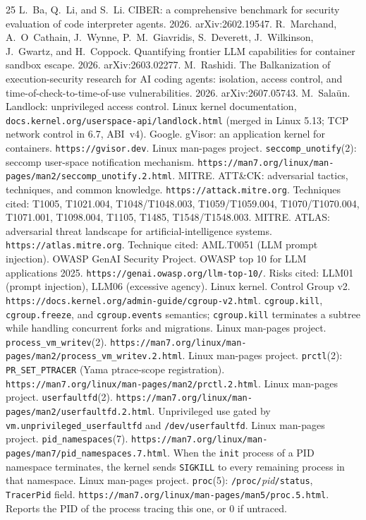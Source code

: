 \documentclass[11pt]{article}
\begin{document}
\begin{thebibliography}{25}
 L.~Ba, Q.~Li, and S.~Li. CIBER: a comprehensive benchmark for security evaluation of code interpreter agents. 2026. arXiv:2602.19547.
 R.~Marchand, A.~O~Cathain, J.~Wynne, P.~M.~Giavridis, S.~Deverett, J.~Wilkinson, J.~Gwartz, and H.~Coppock. Quantifying frontier LLM capabilities for container sandbox escape. 2026. arXiv:2603.02277.
 M.~Rashidi. The Balkanization of execution-security research for AI coding agents: isolation, access control, and time-of-check-to-time-of-use vulnerabilities. 2026. arXiv:2607.05743.
 M.~Salaün. Landlock: unprivileged access control. Linux kernel documentation, \texttt{docs.kernel.org/userspace-api/landlock.html} (merged in Linux 5.13; TCP network control in 6.7, ABI~v4).
 Google. gVisor: an application kernel for containers. \texttt{https://gvisor.dev}.
 Linux man-pages project. \texttt{seccomp\_unotify}(2): seccomp user-space notification mechanism. \texttt{https://man7.org/linux/man-pages/man2/seccomp\_unotify.2.html}.
 MITRE. ATT\&CK: adversarial tactics, techniques, and common knowledge. \texttt{https://attack.mitre.org}. Techniques cited: T1005, T1021.004, T1048/T1048.003, T1059/T1059.004, T1070/T1070.004, T1071.001, T1098.004, T1105, T1485, T1548/T1548.003.
 MITRE. ATLAS: adversarial threat landscape for artificial-intelligence systems. \texttt{https://atlas.mitre.org}. Technique cited: AML.T0051 (LLM prompt injection).
 OWASP GenAI Security Project. OWASP top 10 for LLM applications 2025. \texttt{https://genai.owasp.org/llm-top-10/}. Risks cited: LLM01 (prompt injection), LLM06 (excessive agency).
 Linux kernel. Control Group v2. \texttt{https://docs.kernel.org/admin-guide/cgroup-v2.html}. \texttt{cgroup.kill}, \texttt{cgroup.freeze}, and \texttt{cgroup.events} semantics; \texttt{cgroup.kill} terminates a subtree while handling concurrent forks and migrations.
 Linux man-pages project. \texttt{process\_vm\_writev}(2). \texttt{https://man7.org/linux/man-pages/man2/process\_vm\_writev.2.html}.
 Linux man-pages project. \texttt{prctl}(2): \texttt{PR\_SET\_PTRACER} (Yama ptrace-scope registration). \texttt{https://man7.org/linux/man-pages/man2/prctl.2.html}.
 Linux man-pages project. \texttt{userfaultfd}(2). \texttt{https://man7.org/linux/man-pages/man2/userfaultfd.2.html}. Unprivileged use gated by \texttt{vm.unprivileged\_userfaultfd} and \texttt{/dev/userfaultfd}.
 Linux man-pages project. \texttt{pid\_namespaces}(7). \texttt{https://man7.org/linux/man-pages/man7/pid\_namespaces.7.html}. When the \texttt{init} process of a PID namespace terminates, the kernel sends \texttt{SIGKILL} to every remaining process in that namespace.
 Linux man-pages project. \texttt{proc}(5): \texttt{/proc/}\emph{pid}\texttt{/status}, \texttt{TracerPid} field. \texttt{https://man7.org/linux/man-pages/man5/proc.5.html}. Reports the PID of the process tracing this one, or 0 if untraced.
\end{thebibliography}
\end{document}
